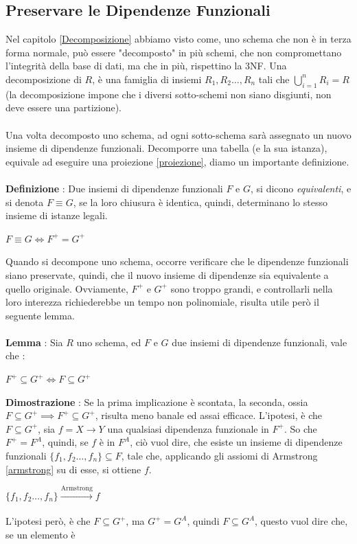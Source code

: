 \documentclass[12pt, letterpaper]{article}
\newcommand{\acc}{\\\hphantom{}\\}
\begin{document}
\subsection{Preservare le Dipendenze Funzionali}
Nel capitolo \ref{Decomposizione} abbiamo visto come, uno schema che non è in terza forma normale, può essere "decomposto" in più 
schemi, che non compromettano l'integrità della base di dati, ma che in più, rispettino la 3NF. Una decomposizione di \(R\), è una 
famiglia di insiemi \(R_1,R_2\dots,R_n\) tali che \(\displaystyle\bigcup_{i=1}^nR_i=R\) (la decomposizione impone che i 
diversi sotto-schemi non siano disgiunti, non deve essere una partizione).\acc Una volta decomposto uno schema, ad ogni 
sotto-schema sarà assegnato un nuovo insieme di dipendenze funzionali. Decomporre una tabella (e la sua istanza), equivale 
ad eseguire una proiezione \ref{proiezione}, diamo un importante definizione.\acc 
\textbf{Definizione }: Due insiemi di dipendenze funzionali \(F\) e \(G\), si dicono \textit{equivalenti}, e si 
denota \(F\equiv G\), se la loro chiusura è identica, quindi, determinano lo stesso insieme di istanze legali.\begin{center}
    \(F\equiv G\iff F^+=G^+\)
\end{center} 
Quando si decompone uno schema, occorre verificare che le dipendenze funzionali siano preservate, quindi, che il nuovo insieme 
di dipendenze sia equivalente a quello originale. Ovviamente, \(F^+\) e \(G^+\) sono troppo grandi, e controllarli nella loro 
interezza richiederebbe un tempo non polinomiale, risulta utile però il seguente lemma.\acc 
\textbf{Lemma }: Sia \(R\) uno schema, ed \(F\) e \(G\) due insiemi di dipendenze funzionali, vale che :\begin{center}
    \(F^+\subseteq G^+\iff F\subseteq G^+\)
\end{center}
\textbf{Dimostrazione} : Se la prima implicazione è scontata, la seconda, ossia \(F\subseteq G^+\implies F^+\subseteq G^+\), risulta meno banale ed 
assai efficace. L'ipotesi, è che \(F\subseteq G^+\), sia \(f=X\rightarrow Y\) una qualsiasi dipendenza funzionale in \(F^+\). 
So che \(F^+=F^A\), quindi, se \(f\) è in \(F^A\), ciò vuol dire, che esiste un insieme di dipendenze funzionali 
\(\{f_1,f_2\dots,f_n\}\subseteq F\), tale che, applicando gli assiomi di Armstrong \ref{armstrong} su di esse, si ottiene \(f\).\begin{center}
    \(\{f_1,f_2\dots,f_n\}\xrightarrow[\text{}]{\text{Armstrong}}f\)
\end{center}
L'ipotesi però, è che \(F\subseteq G^+\), ma \(G^+=G^A\), quindi \(F\subseteq G^A\), questo vuol dire che, se un elemento è 
\end{document}

